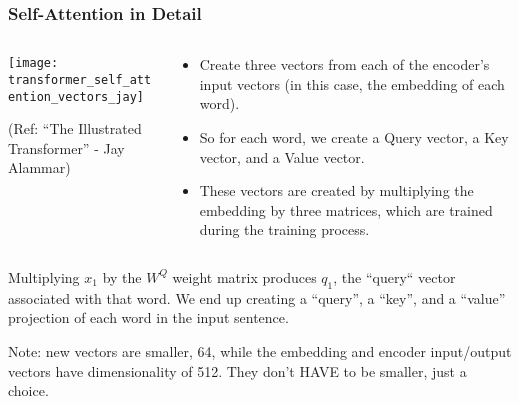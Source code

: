 \begin{frame}[fragile]\frametitle{Self-Attention in Detail}

\begin{columns}
    \begin{column}[T]{0.5\linewidth}
\begin{center}
\texttt{[image: transformer\_self\_attention\_vectors\_jay]}


{\tiny (Ref: ``The Illustrated Transformer'' - Jay Alammar)}
\end{center}		

		\end{column}
    \begin{column}[T]{0.5\linewidth}

\begin{itemize}
\item Create three vectors from each of the encoder’s input vectors (in this case, the embedding of each word). 
\item So for each word, we create a Query vector, a Key vector, and a Value vector. \item These vectors are created by multiplying the embedding by three matrices, which are trained during the training process.
\end{itemize}
    \end{column}
  \end{columns}
  
  Multiplying $x_1$ by the $W^Q$ weight matrix produces $q_1$, the ``query`` vector associated with that word. We end up creating a ``query'', a ``key'', and a ``value'' projection of each word in the input sentence.
  
  Note: new vectors are smaller, 64, while the embedding and encoder input/output vectors have dimensionality of 512. They don’t HAVE to be smaller, just a choice.
\end{frame}

